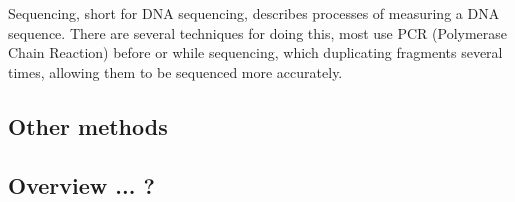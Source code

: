 Sequencing, short for DNA sequencing, describes processes of measuring a DNA
sequence. There are several techniques for doing this, most use PCR (Polymerase
Chain Reaction) before or while sequencing, which duplicating fragments
several times, allowing them to be sequenced more accurately.







\subsection{Other methods}\label{sec:other3c}







\subsection{Overview ... ?}








